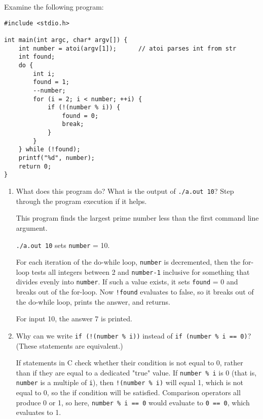 Examine the following program:

\begin{verbatim}
#include <stdio.h>

int main(int argc, char* argv[]) {
    int number = atoi(argv[1]);      // atoi parses int from str
    int found;
    do {
        int i;
        found = 1;
        --number;
        for (i = 2; i < number; ++i) {
            if (!(number % i)) {
                found = 0;
                break;
            }
        }
    } while (!found);
    printf("%d", number);
    return 0;
}
\end{verbatim}

\begin{enumerate}

\item What does this program do? What is the output of \texttt{./a.out 10}? Step through the program execution if it helps.

\begin{answer}
This program finds the largest prime number less than the first command line argument.

\texttt{./a.out 10} sets \texttt{number} = 10.

For each iteration of the do-while loop, \texttt{number} is decremented,
then the for-loop tests all integers between 2 and \texttt{number-1} inclusive for something that divides evenly into \texttt{number}.
If such a value exists, it sets \texttt{found} = 0 and breaks out of the for-loop.
Now \texttt{!found} evaluates to false, so it breaks out of the do-while loop, prints the answer, and returns.

For input 10, the answer 7 is printed.
\end{answer}



\item Why can we write \texttt{if (!(number \% i))} instead of \texttt{if (number \% i == 0)}? (These statements are equivalent.)

\begin{answer}
If statements in C check whether their condition is not equal to 0, rather than if they are equal to a dedicated "true" value. If \texttt{number \% i} is 0 (that is, \texttt{number} is a multiple of \texttt{i}), then \texttt{!(number \% i)} will equal 1, which is not equal to 0, so the if condition will be satisfied. Comparison operators all produce 0 or 1, so here, \texttt{number \% i == 0} would evaluate to \texttt{0 == 0}, which evaluates to 1.
\end{answer}



\end{enumerate}
